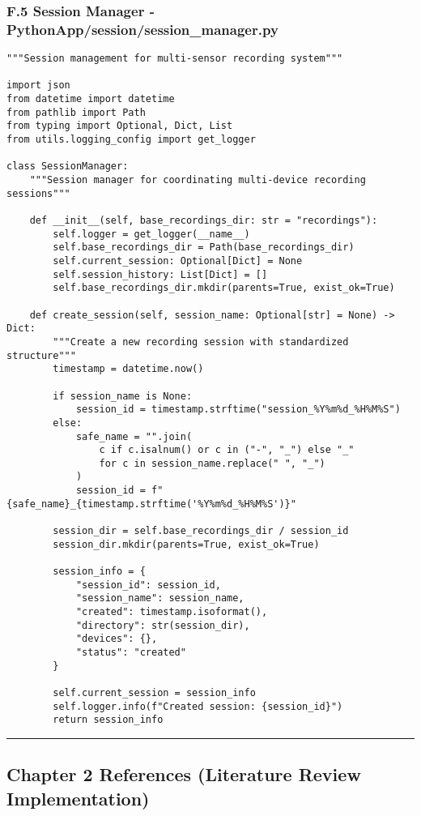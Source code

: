 \documentclass[11pt,a4paper]{article}
\begin{document}
\subsubsection{F.5 Session Manager - PythonApp/session/session_manager.py}

\begin{verbatim}
"""Session management for multi-sensor recording system"""

import json
from datetime import datetime
from pathlib import Path
from typing import Optional, Dict, List
from utils.logging_config import get_logger

class SessionManager:
    """Session manager for coordinating multi-device recording sessions"""

    def __init__(self, base_recordings_dir: str = "recordings"):
        self.logger = get_logger(__name__)
        self.base_recordings_dir = Path(base_recordings_dir)
        self.current_session: Optional[Dict] = None
        self.session_history: List[Dict] = []
        self.base_recordings_dir.mkdir(parents=True, exist_ok=True)

    def create_session(self, session_name: Optional[str] = None) -> Dict:
        """Create a new recording session with standardized structure"""
        timestamp = datetime.now()

        if session_name is None:
            session_id = timestamp.strftime("session_%Y%m%d_%H%M%S")
        else:
            safe_name = "".join(
                c if c.isalnum() or c in ("-", "_") else "_"
                for c in session_name.replace(" ", "_")
            )
            session_id = f"{safe_name}_{timestamp.strftime('%Y%m%d_%H%M%S')}"

        session_dir = self.base_recordings_dir / session_id
        session_dir.mkdir(parents=True, exist_ok=True)

        session_info = {
            "session_id": session_id,
            "session_name": session_name,
            "created": timestamp.isoformat(),
            "directory": str(session_dir),
            "devices": {},
            "status": "created"
        }

        self.current_session = session_info
        self.logger.info(f"Created session: {session_id}")
        return session_info
\end{verbatim}

\hrule

\subsection{Chapter 2 References (Literature Review Implementation)}
\end{document}

